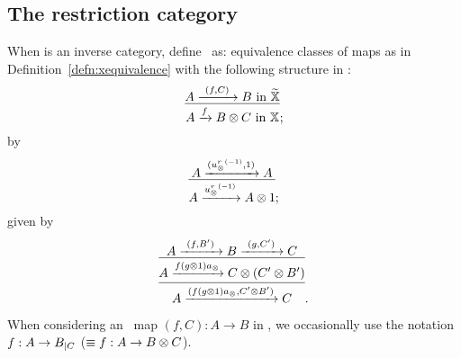\subsection{The restriction category \hypXt} %
\label{sub:the_restriction_category_hypxt}

\begin{definition}\label{def:xt}
  When \X is an inverse category, define \Xt\ as:
  {
    equivalence classes of maps as in Definition~\ref{defn:xequivalence} with the following
    structure in \X: %
    \[
      \infer{A\xrightarrow{f} B\*C \text{ in }\X}{A \xrightarrow{\ (f,C)\ } B \text{ in } \Xt};
    \]
  }
  {%
    by
    \[
      \infer{A\xrightarrow{\inv{u_{\*}^r}}A\* 1}
            {A \xrightarrow{(\inv{u_{\*}^r}, 1)} A};
    \]
  }
  {%
    given by
    \[
      \infer{
        \infer{A\xrightarrow{(f (g\*1) a_{\*},C' \* B')} C}
              {A\xrightarrow{f (g\*1) a_{\*}} C \* (C' \* B')}
            }
            {A \xrightarrow{\ (f,B')\ } B \xrightarrow{\ (g,C')\ } C}.
    \]
  }

\end{definition}

When considering an \Xt\ map $(f,C):A\to B$ in \X, we occasionally use the notation $f:A\to
{B}_{|{C}}$ ($\equiv f:A\to B\otimes C$).

